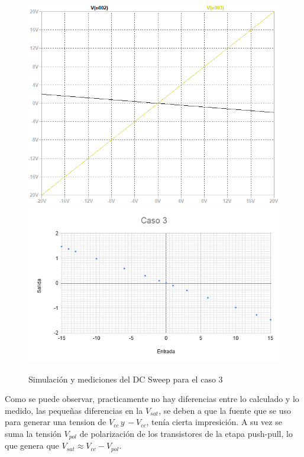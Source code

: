 \begin{figure}[H]
\begin{centering}
\includegraphics[scale=0.4]{../Ex1/iA/Resources1a/dcswp3sim}\includegraphics[scale=0.4]{../Ex1/iA/Resources1a/DCSWEEP3MED}
\par\end{centering}
\caption{Simulación y mediciones del DC Sweep para el caso 3}
\label{1_a_41}

\end{figure}

Como se puede observar, practicamente no hay diferencias entre lo
calculado y lo medido, las pequeñas diferencias en la $V_{sat}$,
se deben a que la fuente que se uso para generar una tension de $V_{cc}\,y\,-V_{cc}$,
tenía cierta impresición. A su vez se suma la tensión $V_{pol}$ de
polarización de los transistores de la etapa push-pull, lo que genera
que $V_{sat}\approx V_{cc}-V_{pol}$.
